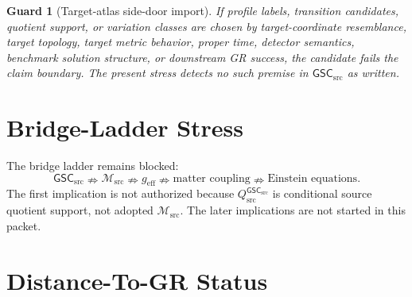 \documentclass[11pt]{article}
\newcommand{\Msrc}{\mathcal{M}_{\mathrm{src}}}
\newcommand{\geff}{g_{\mathrm{eff}}}
\newcommand{\GSC}{\mathsf{GSC}_{\mathrm{src}}}
\newcommand{\Qsrc}{Q_{\mathrm{src}}^{\GSC}}
\newtheorem{guard}{Guard}
\begin{document}
\begin{guard}[Target-atlas side-door import]
If profile labels, transition candidates, quotient support, or variation
classes are chosen by target-coordinate resemblance, target topology, target
metric behavior, proper time, detector semantics, benchmark solution
structure, or downstream GR success, the candidate fails the claim boundary.
The present stress detects no such premise in \(\GSC\) as written.
\end{guard}

\section{Bridge-Ladder Stress}

The bridge ladder remains blocked:
\[
  \GSC \nRightarrow \Msrc \nRightarrow \geff
  \nRightarrow \text{matter coupling}
  \nRightarrow \text{Einstein equations}.
\]
The first implication is not authorized because \(\Qsrc\) is conditional
source quotient support, not adopted \(\Msrc\). The later implications are
not started in this packet.

\section{Distance-To-GR Status}
\end{document}
